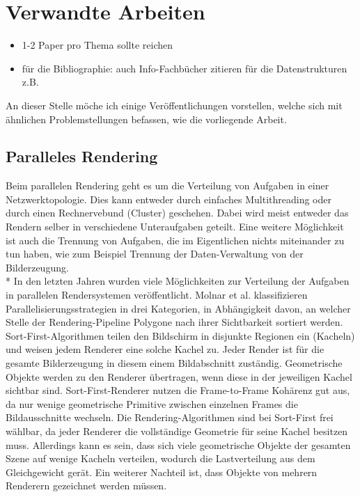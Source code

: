 \chapter{Verwandte Arbeiten}
\label{relatedwork}

\begin{itemize}
 \item 1-2 Paper pro Thema sollte reichen
 \item für die Bibliographie: auch Info-Fachbücher zitieren für die Datenstrukturen z.B.
\end{itemize}

An dieser Stelle möche ich einige Veröffentlichungen vorstellen, welche sich mit ähnlichen Problemstellungen befassen, wie die vorliegende Arbeit.
\section{Paralleles Rendering}
Beim parallelen Rendering geht es um die Verteilung von Aufgaben in einer Netzwerktopologie. Dies kann entweder durch einfaches Multithreading oder durch einen Rechnervebund (Cluster) geschehen. Dabei wird meist entweder das Rendern selber in verschiedene Unteraufgaben geteilt. Eine weitere Möglichkeit ist auch die Trennung von Aufgaben, die im Eigentlichen nichts miteinander zu tun haben, wie zum Beispiel Trennung der Daten-Verwaltung von der Bilderzeugung.\\*
In den letzten Jahren wurden viele Möglichkeiten zur Verteilung der Aufgaben in parallelen Rendersystemen veröffentlicht. Molnar et al.\cite{molnar} klassifizieren Parallelisierungsstrategien in drei Kategorien, in Abhängigkeit davon, an welcher Stelle der Rendering-Pipeline Polygone nach ihrer Sichtbarkeit sortiert werden.\linebreak\linebreak
Sort-First-Algorithmen teilen den Bildschirm in disjunkte Regionen ein (Kacheln) und weisen jedem Renderer eine solche Kachel zu. Jeder Render ist für die gesamte Bilderzeugung in diesem einem Bildabschnitt zuständig. Geometrische Objekte werden zu den Renderer übertragen, wenn diese in der jeweiligen Kachel sichtbar sind. Sort-First-Renderer nutzen die Frame-to-Frame Kohärenz gut aus, da nur wenige geometrische Primitive zwischen einzelnen Frames die Bildausschnitte wechseln. Die Rendering-Algorithmen sind bei Sort-First frei wählbar, da jeder Renderer die vollständige Geometrie für seine Kachel besitzen muss. Allerdings kann es sein, dass sich viele geometrische Objekte der gesamten Szene auf wenige Kacheln verteilen, wodurch die Lastverteilung aus dem Gleichgewicht gerät. Ein weiterer Nachteil ist, dass Objekte von mehrern Renderern gezeichnet werden müssen.\linebreak\linebreak
